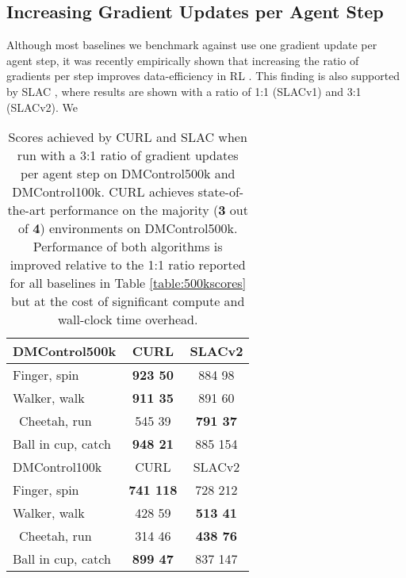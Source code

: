 \documentclass{article}
\begin{document}
\subsection{Increasing Gradient Updates per Agent Step}

Although most baselines we benchmark against use one gradient update per agent step, it was recently empirically shown that increasing the ratio of gradients per step improves data-efficiency in RL \cite{kielak2020rainbow}. This finding is also supported by SLAC \cite{lee2019stochastic}, where results are shown with a ratio of 1:1 (SLACv1) and 3:1 (SLACv2). We 


\begin{table}[h!]
\caption{Scores achieved by CURL and SLAC when run with a 3:1 ratio of gradient updates per agent step on DMControl500k and DMControl100k. CURL achieves state-of-the-art performance on the majority (\textbf{3} out of \textbf{4}) environments on DMControl500k. Performance of both algorithms is improved relative to the 1:1 ratio reported for all baselines in Table \ref{table:500kscores} but at the cost of significant compute and wall-clock time overhead. }
\label{table:three_grad}
\vskip 0.15in
\begin{center}
\begin{small}
\begin{sc}
\begin{tabular}{lcc}
\toprule
DMControl500k & CURL & SLACv2 \\
\midrule
Finger, spin    & \textbf{923  50} & 884  98 \\
Walker, walk    & \textbf{911  35} & 891   60\\\
Cheetah, run    & 545  39 & \textbf{791  37}  \\
Ball in cup, catch   & \textbf{948 
 21 }  & 885  154 \\
\midrule
DMControl100k & CURL & SLACv2 \\
\midrule
Finger, spin    & \textbf{ 741 118 }  & 728 212  \\
Walker, walk    & 428  59 & \textbf{513  41}  \\\
Cheetah, run    & 314  46 & \textbf{438  76}  \\
Ball in cup, catch    & \textbf{ 899  47 }& 837  147  \\
\bottomrule
\end{tabular}
\end{sc}
\end{small}
\end{center}
\vskip -0.1in
\end{table}
\end{document}
